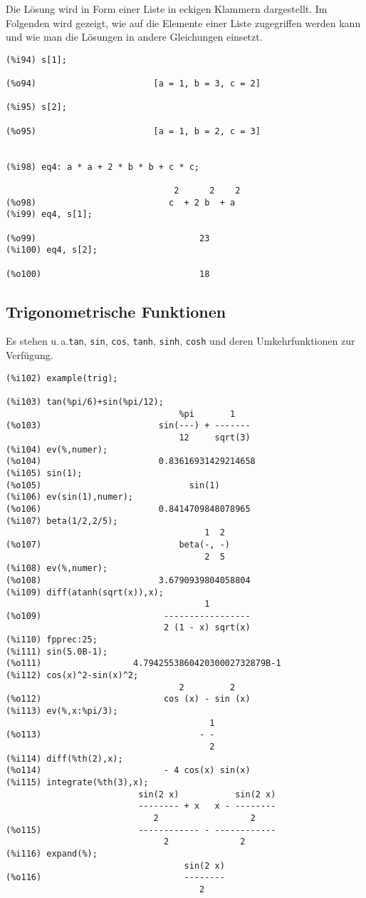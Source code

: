 \documentclass[12pt]{scrartcl}
\newcommand*\ua{u.\,a.\xspace}
\begin{document}
Die Lösung wird in Form einer Liste in eckigen Klammern dargestellt.
Im Folgenden wird gezeigt, wie auf die Elemente  einer Liste
zugegriffen werden kann und wie man die  Lösungen in andere
Gleichungen einsetzt.

\begin{verbatim}
(%i94) s[1];

(%o94)                       [a = 1, b = 3, c = 2]

(%i95) s[2];

(%o95)                       [a = 1, b = 2, c = 3]


(%i98) eq4: a * a + 2 * b * b + c * c;

                                 2      2    2
(%o98)                          c  + 2 b  + a
(%i99) eq4, s[1];

(%o99)                                23
(%i100) eq4, s[2];

(%o100)                               18
\end{verbatim}

\subsection{Trigonometrische Funktionen}

Es stehen \ua\@ \texttt{tan}, \texttt{sin}, \texttt{cos},
\texttt{tanh}, \texttt{sinh}, \texttt{cosh} und deren Umkehrfunktionen
zur Verfügung.

\begin{verbatim}
(%i102) example(trig);

(%i103) tan(%pi/6)+sin(%pi/12);
                                  %pi       1
(%o103)                       sin(---) + -------
                                  12     sqrt(3)
(%i104) ev(%,numer);
(%o104)                       0.83616931429214658
(%i105) sin(1);
(%o105)                             sin(1)
(%i106) ev(sin(1),numer);
(%o106)                       0.8414709848078965
(%i107) beta(1/2,2/5);
                                       1  2
(%o107)                           beta(-, -)
                                       2  5
(%i108) ev(%,numer);
(%o108)                       3.6790939804058804
(%i109) diff(atanh(sqrt(x)),x);
                                       1
(%o109)                        -----------------
                               2 (1 - x) sqrt(x)
(%i110) fpprec:25;
(%i111) sin(5.0B-1);
(%o111)                  4.794255386042030002732879B-1
(%i112) cos(x)^2-sin(x)^2;
                                  2         2
(%o112)                        cos (x) - sin (x)
(%i113) ev(%,x:%pi/3);
                                        1
(%o113)                               - -
                                        2
(%i114) diff(%th(2),x);
(%o114)                        - 4 cos(x) sin(x)
(%i115) integrate(%th(3),x);
                          sin(2 x)           sin(2 x)
                          -------- + x   x - --------
                             2                  2
(%o115)                   ------------ - ------------
                               2              2
(%i116) expand(%);
                                   sin(2 x)
(%o116)                            --------
                                      2
\end{verbatim}
\end{document}
